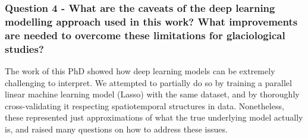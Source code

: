 \subsubsection{Question 4 - What are the caveats of the deep learning modelling approach used in this work? What improvements are needed to overcome these limitations for glaciological studies?}

The work of this PhD showed how deep learning models can be extremely challenging to interpret. We attempted to partially do so by training a parallel linear machine learning model (Lasso) with the same dataset, and by thoroughly cross-validating it respecting spatiotemporal structures in data. Nonetheless, these represented just approximations of what the true underlying model actually is, and raised many questions on how to address these issues. 


